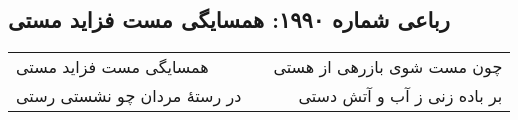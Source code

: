 \begin{center}
\section*{رباعی شماره ۱۹۹۰: همسایگی مست فزاید مستی}
\label{sec:1990}
\begin{longtable}{l p{0.5cm} r}
همسایگی مست فزاید مستی
&&
چون مست شوی بازرهی از هستی
\\
در رستهٔ مردان چو نشستی رستی
&&
بر باده زنی ز آب و آتش دستی
\\
\end{longtable}
\end{center}
